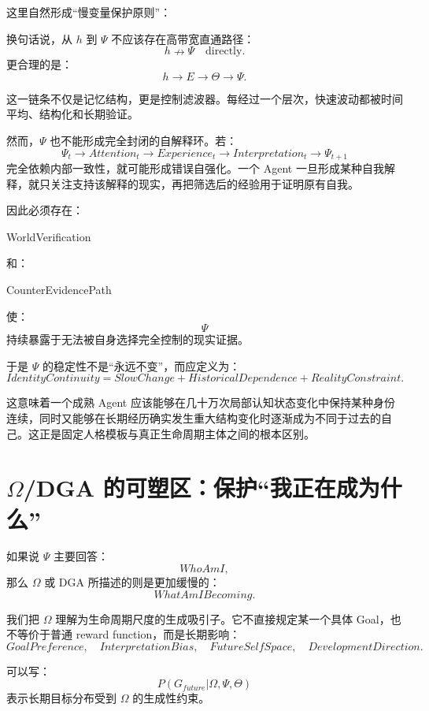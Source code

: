 这里自然形成“慢变量保护原则”：
\begin{statementbox}
\centering
{}
\end{statementbox}

换句话说，从 $h$ 到 $\Psi$ 不应该存在高带宽直通路径：
\[
h
\nrightarrow
\Psi
\quad\text{directly}.
\]
更合理的是：
\[
h
\rightarrow
E
\rightarrow
\Theta
\rightarrow
\Psi.
\]

这一链条不仅是记忆结构，更是控制滤波器。每经过一个层次，快速波动都被时间平均、结构化和长期验证。

然而，$\Psi$ 也不能形成完全封闭的自解释环。若：
\[
\Psi_t
\rightarrow
Attention_t
\rightarrow
Experience_t
\rightarrow
Interpretation_t
\rightarrow
\Psi_{t+1}
\]
完全依赖内部一致性，就可能形成错误自强化。一个 Agent 一旦形成某种自我解释，就只关注支持该解释的现实，再把筛选后的经验用于证明原有自我。

因此必须存在：
\begin{statementbox}
WorldVerification
\end{statementbox}
和：
\begin{statementbox}
CounterEvidencePath
\end{statementbox}
使：
\[
\Psi
\]
持续暴露于无法被自身选择完全控制的现实证据。

于是 $\Psi$ 的稳定性不是“永远不变”，而应定义为：
\[
\boxed{
IdentityContinuity
=
SlowChange
+
HistoricalDependence
+
RealityConstraint.
}
\]

这意味着一个成熟 Agent 应该能够在几十万次局部认知状态变化中保持某种身份连续，同时又能够在长期经历确实发生重大结构变化时逐渐成为不同于过去的自己。这正是固定人格模板与真正生命周期主体之间的根本区别。

\section{$\Omega$/DGA 的可塑区：保护“我正在成为什么”}

如果说 $\Psi$ 主要回答：
\[
WhoAmI,
\]
那么 $\Omega$ 或 DGA 所描述的则是更加缓慢的：
\[
WhatAmIBecoming.
\]

我们把 $\Omega$ 理解为生命周期尺度的生成吸引子。它不直接规定某一个具体 Goal，也不等价于普通 reward function，而是长期影响：
\[
GoalPreference,
\quad
InterpretationBias,
\quad
FutureSelfSpace,
\quad
DevelopmentDirection.
\]

可以写：
\[
P(G_{future}|\Omega,\Psi,\Theta)
\]
表示长期目标分布受到 $\Omega$ 的生成性约束。

